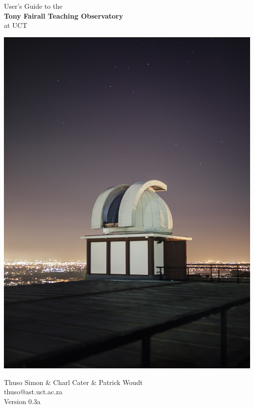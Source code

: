 \documentclass[12pt,twoside,a4paper]{report}
\begin{document}
  \begin{titlepage}
  \vspace*{\fill}
  \begin{center}
    {\Huge
    User's Guide to the\\ \textbf{Tony Fairall Teaching Observatory}\\ at UCT\\}

    \vspace{0.75cm}

    \includegraphics[width=13.5cm]{documentation_images/dome_at_night.jpg}

    \vspace{0.75cm}

    {\small Thuso Simon \& Charl Cater \& Patrick Woudt\\thuso@ast.uct.ac.za\\Version $0.3$a}
    \end{center}
    \vspace*{\fill}
  \end{titlepage}
\end{document}
